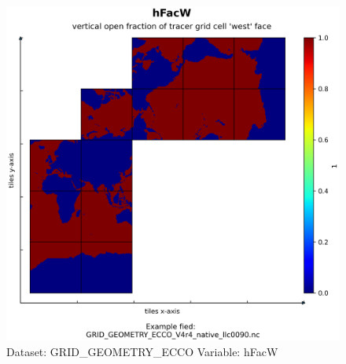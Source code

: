 \begin{figure}[H]
\centering
\includegraphics[scale=0.55]{../images/plots/native_plots_coords/Geometry_Parameters_for_the_Lat-Lon-Cap_90_(llc90)_Native_Model_Grid_(Version_4_Release_4)/hFacW.png}
\caption{Dataset: GRID\_GEOMETRY\_ECCO Variable: hFacW}
\label{tab:table-GRID_GEOMETRY_ECCO_hFacW-Plot}
\end{figure}
\pagebreak
